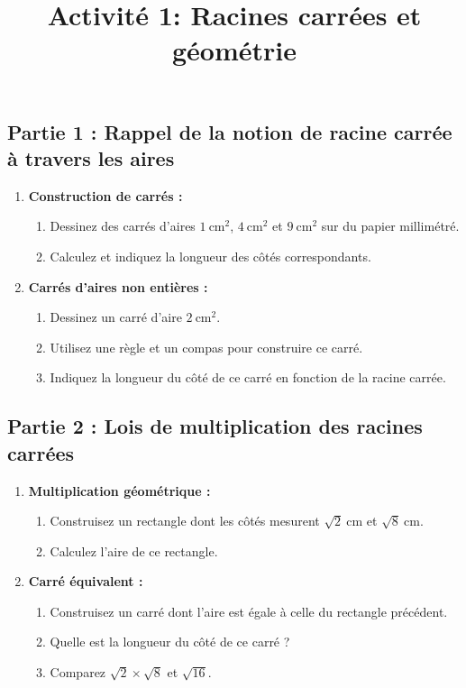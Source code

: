 \documentclass{article}
\title{Activité 1: Racines carrées et géométrie}
\author{}
\date{}
\begin{document}
\maketitle

\subsection*{Partie 1 : Rappel de la notion de racine carrée à travers les aires}

\begin{enumerate}
    \item \textbf{Construction de carrés :}
    \begin{enumerate}
        \item Dessinez des carrés d'aires $1~\text{cm}^2$, $4~\text{cm}^2$ et $9~\text{cm}^2$ sur du papier millimétré.
        \item Calculez et indiquez la longueur des côtés correspondants.
    \end{enumerate}
    \item \textbf{Carrés d'aires non entières :}
    \begin{enumerate}
        \item Dessinez un carré d'aire $2~\text{cm}^2$.
        \item Utilisez une règle et un compas pour construire ce carré.
        \item Indiquez la longueur du côté de ce carré en fonction de la racine carrée.
    \end{enumerate}
\end{enumerate}

\subsection*{Partie 2 : Lois de multiplication des racines carrées}

\begin{enumerate}
    \item \textbf{Multiplication géométrique :}
    \begin{enumerate}
        \item Construisez un rectangle dont les côtés mesurent $\sqrt{2}~\text{cm}$ et $\sqrt{8}~\text{cm}$.
        \item Calculez l'aire de ce rectangle.
    \end{enumerate}
    \item \textbf{Carré équivalent :}
    \begin{enumerate}
        \item Construisez un carré dont l'aire est égale à celle du rectangle précédent.
        \item Quelle est la longueur du côté de ce carré ?
        \item Comparez $\sqrt{2} \times \sqrt{8}$ et $\sqrt{16}$.
    \end{enumerate}
\end{enumerate}
\end{document}
